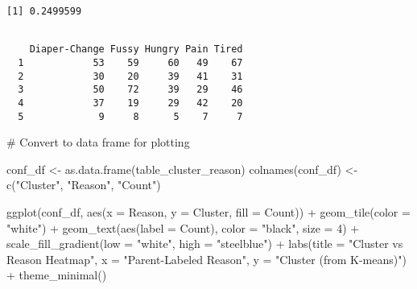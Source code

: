 \documentclass[
  letterpaper,
  DIV=11,
  numbers=noendperiod]{scrartcl}
\newenvironment{Shaded}{\begin{snugshade}}{\end{snugshade}}
\newcommand{\AttributeTok}[1]{\textcolor[rgb]{0.40,0.45,0.13}{#1}}
\newcommand{\CommentTok}[1]{\textcolor[rgb]{0.37,0.37,0.37}{#1}}
\newcommand{\DecValTok}[1]{\textcolor[rgb]{0.68,0.00,0.00}{#1}}
\newcommand{\FunctionTok}[1]{\textcolor[rgb]{0.28,0.35,0.67}{#1}}
\newcommand{\NormalTok}[1]{\textcolor[rgb]{0.00,0.23,0.31}{#1}}
\newcommand{\OtherTok}[1]{\textcolor[rgb]{0.00,0.23,0.31}{#1}}
\newcommand{\SpecialCharTok}[1]{\textcolor[rgb]{0.37,0.37,0.37}{#1}}
\newcommand{\StringTok}[1]{\textcolor[rgb]{0.13,0.47,0.30}{#1}}
\begin{document}
\begin{verbatim}
[1] 0.2499599
\end{verbatim}

\begin{Shaded}
\end{Shaded}

\begin{verbatim}
   
    Diaper-Change Fussy Hungry Pain Tired
  1            53    59     60   49    67
  2            30    20     39   41    31
  3            50    72     39   29    46
  4            37    19     29   42    20
  5             9     8      5    7     7
\end{verbatim}

\begin{Shaded}
\begin{Highlighting}[]
\CommentTok{\# Convert to data frame for plotting}

\NormalTok{conf\_df }\OtherTok{\textless{}{-}} \FunctionTok{as.data.frame}\NormalTok{(table\_cluster\_reason)}
\FunctionTok{colnames}\NormalTok{(conf\_df) }\OtherTok{\textless{}{-}} \FunctionTok{c}\NormalTok{(}\StringTok{"Cluster"}\NormalTok{, }\StringTok{"Reason"}\NormalTok{, }\StringTok{"Count"}\NormalTok{)}

\FunctionTok{ggplot}\NormalTok{(conf\_df, }\FunctionTok{aes}\NormalTok{(}\AttributeTok{x =}\NormalTok{ Reason, }\AttributeTok{y =}\NormalTok{ Cluster, }\AttributeTok{fill =}\NormalTok{ Count)) }\SpecialCharTok{+}
  \FunctionTok{geom\_tile}\NormalTok{(}\AttributeTok{color =} \StringTok{"white"}\NormalTok{) }\SpecialCharTok{+}
  \FunctionTok{geom\_text}\NormalTok{(}\FunctionTok{aes}\NormalTok{(}\AttributeTok{label =}\NormalTok{ Count), }\AttributeTok{color =} \StringTok{"black"}\NormalTok{, }\AttributeTok{size =} \DecValTok{4}\NormalTok{) }\SpecialCharTok{+}
  \FunctionTok{scale\_fill\_gradient}\NormalTok{(}\AttributeTok{low =} \StringTok{"white"}\NormalTok{, }\AttributeTok{high =} \StringTok{"steelblue"}\NormalTok{) }\SpecialCharTok{+}
  \FunctionTok{labs}\NormalTok{(}\AttributeTok{title =} \StringTok{"Cluster vs Reason Heatmap"}\NormalTok{,}
       \AttributeTok{x =} \StringTok{"Parent{-}Labeled Reason"}\NormalTok{,}
       \AttributeTok{y =} \StringTok{"Cluster (from K{-}means)"}\NormalTok{) }\SpecialCharTok{+}
  \FunctionTok{theme\_minimal}\NormalTok{()}
\end{Highlighting}
\end{Shaded}
\end{document}
